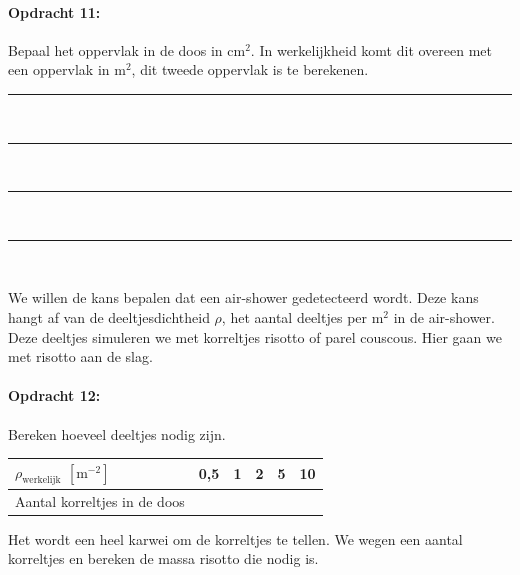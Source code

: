 \begin{minipage}[t]{\columnwidth}%

\paragraph{Opdracht 11:}

Bepaal het oppervlak in de doos in $\mathrm{cm^{2}}$. In
werkelijkheid komt dit overeen met een oppervlak in $\mathrm{m^{2}}$,
dit tweede oppervlak is te berekenen.

\begin{center}
    \rule{\textwidth}{0.3mm}\\
    \rule{\textwidth}{0.3mm}\\
    \rule{\textwidth}{0.3mm}\\
    \rule{\textwidth}{0.3mm}\\
\end{center}
\end{minipage}\bigskip{}

We willen de kans bepalen dat een air-shower gedetecteerd wordt. Deze
kans hangt af van de deeltjesdichtheid $\rho$, het aantal deeltjes
per $\mathrm{m^{2}}$ in de air-shower. Deze deeltjes simuleren we
met korreltjes risotto of parel couscous. Hier gaan we met risotto aan de slag.

\begin{minipage}[t]{1\columnwidth}%

\paragraph{Opdracht 12:}

Bereken hoeveel deeltjes nodig zijn.

\bigskip{}

\begin{tabular}{|x{.3\textwidth}|x{.1\textwidth}|x{.1\textwidth}
                |x{.1\textwidth}|x{.1\textwidth}|x{.1\textwidth}|}
    \hline
    $\rho_\textrm{werkelijk}$ $\left[\mathrm{m^{-2}}\right]$ & 0,5 & 1 & 2 & 5 & 10 \\
    \hline
    Aantal korreltjes in de doos &  &  &  &  & \\
    \hline
    \end{tabular}%
\end{minipage}

\bigskip{}
Het wordt een heel karwei om de korreltjes te tellen. We wegen een
aantal korreltjes en bereken de massa risotto die nodig is.

